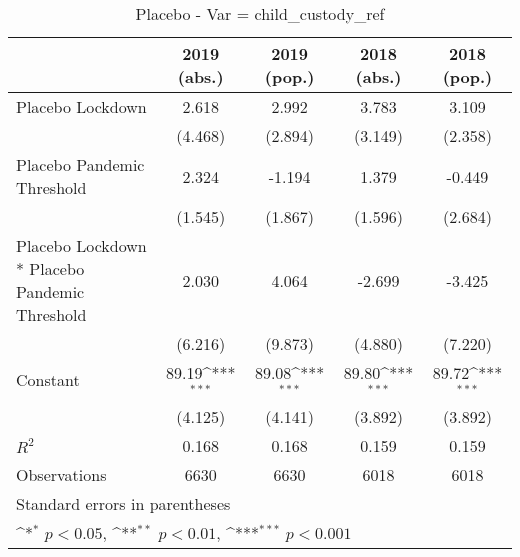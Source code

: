 \documentclass{article}
\begin{document}
{
\def\sym#1{\ifmmode^{#1}\else\(^{#1}\)\fi}
\begin{longtable}{l*{4}{c}}
\caption{Placebo - Var = child\_custody\_ref}\\
\hline\hline\endfirsthead\hline\endhead\hline\endfoot\endlastfoot
                &\multicolumn{1}{c}{2019 (abs.)}&\multicolumn{1}{c}{2019 (pop.)}&\multicolumn{1}{c}{2018 (abs.)}&\multicolumn{1}{c}{2018 (pop.)}\\
\hline
Placebo Lockdown&    2.618         &    2.992         &    3.783         &    3.109         \\
                &  (4.468)         &  (2.894)         &  (3.149)         &  (2.358)         \\
Placebo Pandemic Threshold&    2.324         &   -1.194         &    1.379         &   -0.449         \\
                &  (1.545)         &  (1.867)         &  (1.596)         &  (2.684)         \\
Placebo Lockdown * Placebo Pandemic Threshold&    2.030         &    4.064         &   -2.699         &   -3.425         \\
                &  (6.216)         &  (9.873)         &  (4.880)         &  (7.220)         \\
Constant        &    89.19\sym{***}&    89.08\sym{***}&    89.80\sym{***}&    89.72\sym{***}\\
                &  (4.125)         &  (4.141)         &  (3.892)         &  (3.892)         \\
\hline
\(R^{2}\)       &    0.168         &    0.168         &    0.159         &    0.159         \\
Observations    &     6630         &     6630         &     6018         &     6018         \\
\hline\hline
\multicolumn{5}{l}{\footnotesize Standard errors in parentheses}\\
\multicolumn{5}{l}{\footnotesize \sym{*} \(p<0.05\), \sym{**} \(p<0.01\), \sym{***} \(p<0.001\)}\\
\end{longtable}
}
\end{document}

